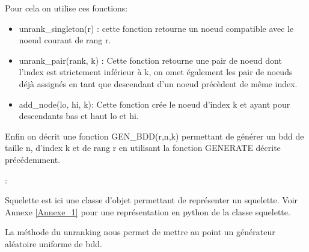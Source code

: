 \documentclass[french]{article}
\begin{document}
Pour cela on utilise ces fonctions:
\begin{itemize}
    \item unrank\_singleton(r) : cette fonction retourne un noeud compatible avec le noeud courant de rang r.
    \item unrank\_pair(rank, k) : Cette fonction retourne une pair de noeud dont l'index est strictement inférieur à k, on omet également les pair de noeuds déjà assignés en tant que descendant d'un noeud précèdent de même index.
    
    \item add\_node(lo, hi, k): Cette fonction crée le noeud d'index k et ayant pour descendants bas et haut lo et hi.
\end{itemize}

\newpage
Enfin on décrit une fonction GEN\_BDD(r,n,k) permettant de générer un bdd de taille n, d'index k et de rang r en utilisant la fonction GENERATE décrite précédemment.

\begin{algorithm}
  \begin{algorithmic}[1]
    \Statex
            \State {}
            \State {}
            \State {}
            \State {}
            \State {}
                \State {}
                :
                    \State {}
                    \State {}
                    \State {}
            \EndFor
  \end{algorithmic}
\end{algorithm}

Squelette est ici une classe d'objet permettant de représenter un squelette. Voir Annexe \ref{Annexe_1} pour une représentation en python de la classe squelette.

La méthode du unranking nous permet de mettre au point un générateur aléatoire uniforme de bdd.
\end{document}
